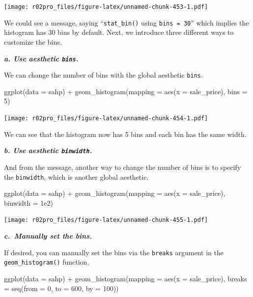 \documentclass[
]{book}
\newenvironment{Shaded}{\begin{snugshade}}{\end{snugshade}}
\newcommand{\AttributeTok}[1]{\textcolor[rgb]{0.77,0.63,0.00}{#1}}
\newcommand{\DecValTok}[1]{\textcolor[rgb]{0.00,0.00,0.81}{#1}}
\newcommand{\FloatTok}[1]{\textcolor[rgb]{0.00,0.00,0.81}{#1}}
\newcommand{\FunctionTok}[1]{\textcolor[rgb]{0.00,0.00,0.00}{#1}}
\newcommand{\NormalTok}[1]{#1}
\newcommand{\SpecialCharTok}[1]{\textcolor[rgb]{0.00,0.00,0.00}{#1}}
\begin{document}
\texttt{[image: r02pro\_files/figure-latex/unnamed-chunk-453-1.pdf]}

We could see a message, saying ``\texttt{stat\_bin()} using \texttt{bins\ =\ 30}'' which implies the histogram has 30 bins by default. Next, we introduce three different ways to customize the bins.

\textbf{\emph{a. Use aesthetic \texttt{bins}.}}

We can change the number of bins with the global aesthetic \texttt{bins}.

\begin{Shaded}
\begin{Highlighting}[]
\FunctionTok{ggplot}\NormalTok{(}\AttributeTok{data =}\NormalTok{ sahp) }\SpecialCharTok{+} \FunctionTok{geom\_histogram}\NormalTok{(}\AttributeTok{mapping =} \FunctionTok{aes}\NormalTok{(}\AttributeTok{x =}\NormalTok{ sale\_price), }\AttributeTok{bins =} \DecValTok{5}\NormalTok{)}
\end{Highlighting}
\end{Shaded}

\texttt{[image: r02pro\_files/figure-latex/unnamed-chunk-454-1.pdf]}

We can see that the histogram now has 5 bins and each bin has the same width.

\textbf{\emph{b. Use aesthetic \texttt{binwidth}.}}

And from the message, another way to change the number of bins is to specify the \texttt{binwidth}, which is another global aesthetic.

\begin{Shaded}
\begin{Highlighting}[]
\FunctionTok{ggplot}\NormalTok{(}\AttributeTok{data =}\NormalTok{ sahp) }\SpecialCharTok{+} \FunctionTok{geom\_histogram}\NormalTok{(}\AttributeTok{mapping =} \FunctionTok{aes}\NormalTok{(}\AttributeTok{x =}\NormalTok{ sale\_price), }\AttributeTok{binwidth =} \FloatTok{1e2}\NormalTok{)}
\end{Highlighting}
\end{Shaded}

\texttt{[image: r02pro\_files/figure-latex/unnamed-chunk-455-1.pdf]}

\textbf{\emph{c.~Manually set the bins.}}

If desired, you can manually set the bins via the \texttt{breaks} argument in the \texttt{geom\_histogram()} function.

\begin{Shaded}
\begin{Highlighting}[]
\FunctionTok{ggplot}\NormalTok{(}\AttributeTok{data =}\NormalTok{ sahp) }\SpecialCharTok{+} \FunctionTok{geom\_histogram}\NormalTok{(}\AttributeTok{mapping =} \FunctionTok{aes}\NormalTok{(}\AttributeTok{x =}\NormalTok{ sale\_price), }\AttributeTok{breaks =} \FunctionTok{seq}\NormalTok{(}\AttributeTok{from =} \DecValTok{0}\NormalTok{, }\AttributeTok{to =} \DecValTok{600}\NormalTok{, }\AttributeTok{by =} \DecValTok{100}\NormalTok{))  }
\end{Highlighting}
\end{Shaded}
\end{document}
